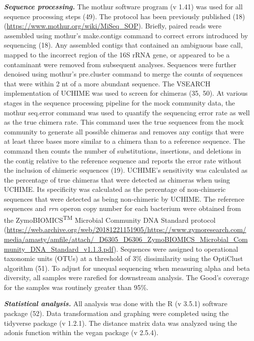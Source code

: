 \documentclass[11pt,]{article}
\begin{document}
\textbf{\emph{Sequence processing.}} The mothur software program (v
1.41) was used for all sequence processing steps (49). The protocol has
been previously published (18)
(\url{https://www.mothur.org/wiki/MiSeq_SOP}). Briefly, paired reads
were assembled using mothur's make.contigs command to correct errors
introduced by sequencing (18). Any assembled contigs that contained an
ambiguous base call, mapped to the incorrect region of the 16S rRNA
gene, or appeared to be a contaminant were removed from subsequent
analyses. Sequences were further denoised using mothur's pre.cluster
command to merge the counts of sequences that were within 2 nt of a more
abundant sequence. The VSEARCH implementation of UCHIME was used to
screen for chimeras (35, 50). At various stages in the sequence
processing pipeline for the mock community data, the mothur seq.error
command was used to quantify the sequencing error rate as well as the
true chimera rate. This command uses the true sequences from the mock
community to generate all possible chimeras and removes any contigs that
were at least three bases more similar to a chimera than to a reference
sequence. The command then counts the number of substitutions,
insertions, and deletions in the contig relative to the reference
sequence and reports the error rate without the inclusion of chimeric
sequences (19). UCHIME's sensitivity was calculated as the percentage of
true chimeras that were detected as chimeras when using UCHIME. Its
specificity was calculated as the percentage of non-chimeric sequences
that were detected as being non-chimeric by UCHIME. The reference
sequences and \emph{rrn} operon copy number for each bacterium were
obtained from the ZymoBIOMICS\textsuperscript{TM} Microbial Community
DNA Standard protocol
(\url{https://web.archive.org/web/20181221151905/https://www.zymoresearch.com/media/amasty/amfile/attach/_D6305_D6306_ZymoBIOMICS_Microbial_Community_DNA_Standard_v1.1.3.pdf}).
Sequences were assigned to operational taxonomic units (OTUs) at a
threshold of 3\% dissimilarity using the OptiClust algorithm (51). To
adjust for unequal sequencing when measuring alpha and beta diversity,
all samples were rarefied for downstream analysis. The Good's coverage
for the samples was routinely greater than 95\%.

\textbf{\emph{Statistical analysis.}} All analysis was done with the R
(v 3.5.1) software package (52). Data transformation and graphing were
completed using the tidyverse package (v 1.2.1). The distance matrix
data was analyzed using the adonis function within the vegan package (v
2.5.4).
\end{document}
